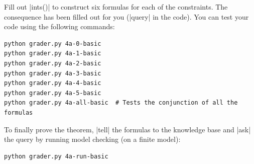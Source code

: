 \item {}
Fill out |ints()| to construct six formulas for each of the constraints.  The
consequence has been filled out for you (|query| in the code). You can test your
code using the following commands:
\begin{lstlisting}
python grader.py 4a-0-basic
python grader.py 4a-1-basic
python grader.py 4a-2-basic
python grader.py 4a-3-basic
python grader.py 4a-4-basic
python grader.py 4a-5-basic
python grader.py 4a-all-basic  # Tests the conjunction of all the formulas
\end{lstlisting}

To finally prove the theorem, |tell| the formulas to the knowledge base and
|ask| the query by running model checking (on a finite model):
\begin{lstlisting}
python grader.py 4a-run-basic
\end{lstlisting}

